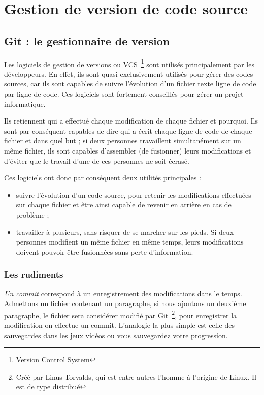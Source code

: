 \chapter{Gestion de version de code source}

\section{Git : le gestionnaire de version}

Les logiciels de gestion de versions ou VCS\, \footnote{Version Control
System} sont utilisés principalement par les développeurs. En effet, ils sont
quasi exclusivement utilisés pour gérer des codes sources, car ils sont
capables de suivre l’évolution d’un fichier texte ligne de code par ligne de
code. Ces logiciels sont fortement conseillés pour gérer un projet
informatique.

Ils retiennent qui a effectué chaque modification de chaque fichier et
pourquoi. Ils sont par conséquent capables de dire qui a écrit chaque ligne de
code de chaque fichier et dans quel but ; si deux personnes travaillent
simultanément sur un même fichier, ils sont capables d’assembler (de fusionner)
leurs modifications et d’éviter que le travail d’une de ces personnes ne soit
écrasé.

Ces logiciels ont donc par conséquent deux utilités principales :
\begin{itemize}
    \item suivre l’évolution d’un code source, pour retenir les modifications
effectuées sur chaque fichier et être ainsi capable de revenir en arrière en
cas de problème ;
    \item travailler à plusieurs, sans risquer de se marcher sur les pieds.
Si deux personnes modifient un même fichier en même temps, leurs modifications
doivent pouvoir être fusionnées sans perte d’information.
\end{itemize}

\subsection{Les rudiments}

\emph{Un commit} correspond à un enregistrement des modifications dans le temps.
Admettons un fichier contenant un paragraphe, si nous ajoutons un deuxième
paragraphe, le fichier sera considérer modifié par Git\, \footnote{Créé par
Linus Torvalds, qui est entre autres l’homme à l’origine de Linux. Il est de
type distribué}, pour enregistrer la modification on effectue un commit.
L'analogie la plus simple est celle des sauvegardes dans les jeux vidéos ou
vous sauvegardez votre progression.

